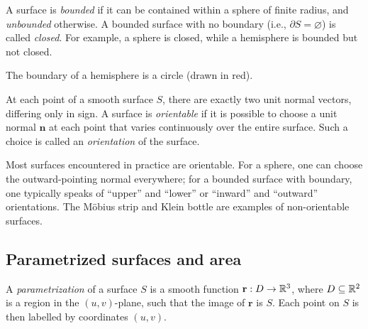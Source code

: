 \documentclass[a4paper]{article}
\begin{document}
\begin{defi}
  A surface is \emph{bounded} if it can be contained within a sphere of finite radius, and \emph{unbounded} otherwise. A bounded surface with no boundary (i.e., $\partial S = \varnothing$) is called \emph{closed}. For example, a sphere is closed, while a hemisphere is bounded but not closed.
\end{defi}

\begin{eg}\leavevmode
  \begin{center}
  \end{center}
  The boundary of a hemisphere is a circle (drawn in red).
\end{eg}

\begin{defi}
  At each point of a smooth surface $S$, there are exactly two unit normal vectors, differing only in sign. A surface is \emph{orientable} if it is possible to choose a unit normal $\mathbf{n}$ at each point that varies continuously over the entire surface. Such a choice is called an \emph{orientation} of the surface.
\end{defi}

\begin{rmk}
  Most surfaces encountered in practice are orientable. For a sphere, one can choose the outward-pointing normal everywhere; for a bounded surface with boundary, one typically speaks of ``upper'' and ``lower'' or ``inward'' and ``outward'' orientations. The M\"obius strip and Klein bottle are examples of non-orientable surfaces.
\end{rmk}

\subsection{Parametrized surfaces and area}
\begin{defi}
  A \emph{parametrization} of a surface $S$ is a smooth function $\mathbf{r}: D \to \mathbb{R}^3$, where $D \subseteq \mathbb{R}^2$ is a region in the $(u, v)$-plane, such that the image of $\mathbf{r}$ is $S$. Each point on $S$ is then labelled by coordinates $(u, v)$.
\end{defi}
\end{document}
